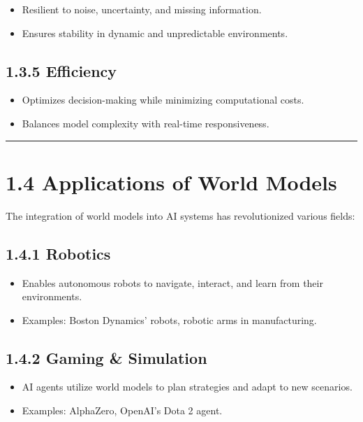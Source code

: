 \documentclass[
]{book}
\providecommand{\tightlist}{%
  \setlength{\itemsep}{0pt}\setlength{\parskip}{0pt}}
\begin{document}
\begin{itemize}
\tightlist
\item
  Resilient to noise, uncertainty, and missing information.
\item
  Ensures stability in dynamic and unpredictable environments.
\end{itemize}

\subsection{1.3.5 Efficiency}\label{efficiency}

\begin{itemize}
\tightlist
\item
  Optimizes decision-making while minimizing computational costs.
\item
  Balances model complexity with real-time responsiveness.
\end{itemize}

\begin{center}\rule{0.5\linewidth}{0.5pt}\end{center}

\section{1.4 Applications of World Models}\label{applications-of-world-models}

The integration of world models into AI systems has revolutionized various fields:

\subsection{1.4.1 Robotics}\label{robotics}

\begin{itemize}
\tightlist
\item
  Enables autonomous robots to navigate, interact, and learn from their environments.
\item
  Examples: Boston Dynamics' robots, robotic arms in manufacturing.
\end{itemize}

\subsection{1.4.2 Gaming \& Simulation}\label{gaming-simulation}

\begin{itemize}
\tightlist
\item
  AI agents utilize world models to plan strategies and adapt to new scenarios.
\item
  Examples: AlphaZero, OpenAI's Dota 2 agent.
\end{itemize}
\end{document}
